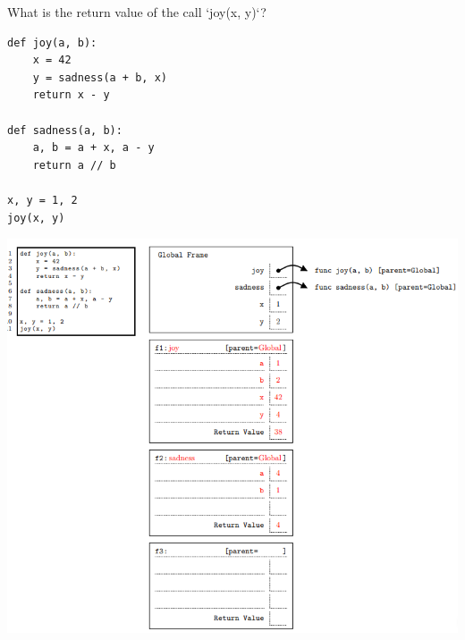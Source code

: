 \begin{blocksection}
\question What is the return value of the call `joy(x, y)`? 

\begin{lstlisting}
def joy(a, b):
    x = 42
    y = sadness(a + b, x)
    return x - y

def sadness(a, b):
    a, b = a + x, a - y
    return a // b

x, y = 1, 2
joy(x, y)
\end{lstlisting}

\begin{solution}[2in]
\includegraphics[width=\linewidth]{joy.png}
\end{solution}
\end{blocksection}
